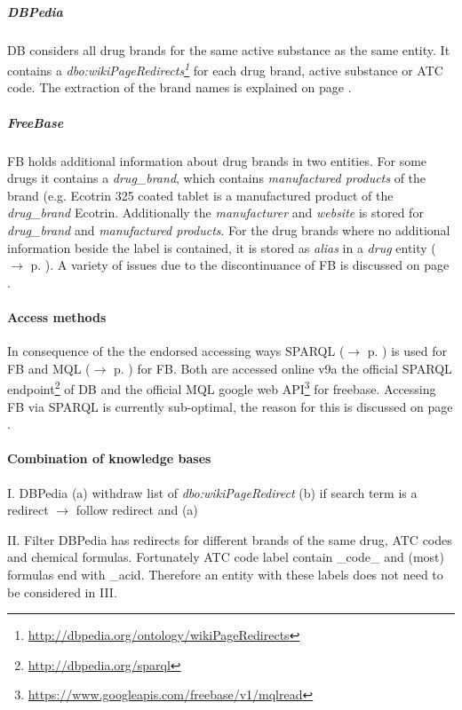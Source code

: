 \documentclass[11pt,titlepage,oneside,openany]{book}
\begin{document}
\subparagraph{DBPedia}
\label{dbpedia}

DB considers all drug brands for the same active substance as the same entity. It contains a \textit{dbo:wikiPageRedirects\footnote{\url{http://dbpedia.org/ontology/wikiPageRedirects}}} for each drug brand, active substance or ATC code. The extraction of the brand names is explained on page \pageref{filtering}.


\subparagraph{FreeBase}
\label{freebase}

FB holds additional information about drug brands in two entities. For some  drugs it contains a \textit{drug\_brand}, which contains \textit{manufactured products} of the brand (e.g. Ecotrin 325 coated tablet is a manufactured product of the \textit{drug\_brand} Ecotrin. Additionally the \textit{manufacturer} and \textit{website} is stored for \textit{drug\_brand} and \textit{manufactured products}.
For the drug brands where no additional information beside the label is contained, it is stored as \textit{alias} in a \textit{drug} entity ($\rightarrow$ p. \pageref{limitations:fb_drugs}).  A variety of issues due to the discontinuance of FB is discussed on page \pageref{prob:freebase}.



\paragraph{Access methods}
\label{access_methods}
In consequence of the the endorsed accessing ways SPARQL ($\rightarrow$ p. \pageref{sparql}) is used for FB and MQL ($\rightarrow$ p. \pageref{mql}) for FB. Both are accessed online v9a the official SPARQL endpoint\footnote{\url{http://dbpedia.org/sparql}} of DB and the official MQL google web API\footnote{\url{https://www.googleapis.com/freebase/v1/mqlread}} for freebase. Accessing FB via SPARQL is currently sub-optimal, the reason for this is discussed on page \pageref{challenges:fb}.



\paragraph{Combination of knowledge bases}
\label{dataset_combination}

I. DBPedia
(a) withdraw list of \textit{dbo:wikiPageRedirect}
(b) if search term is a redirect $\rightarrow$ follow redirect and (a)

II. Filter 
DBPedia has redirects for different brands of the same drug, ATC codes and chemical formulas. Fortunately ATC code label contain \_code\_ and (most) formulas end with \_acid. Therefore an entity with these labels does not need to be considered in III.
\end{document}
